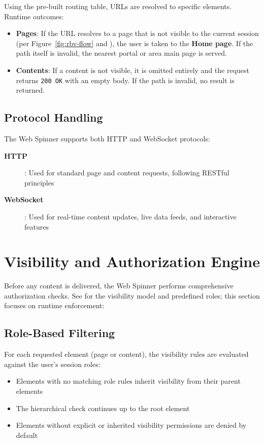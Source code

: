 Using the pre-built routing table, URLs are resolved to specific \wbol{} elements. Runtime outcomes:
\begin{itemize}
	\item \textbf{Pages}: If the URL resolves to a page that is not visible to the current session (per Figure~\ref{fig:rbv-flow} and ), the user is taken to the \textbf{Home page}. If the path itself is invalid, the nearest portal or area main page is served.
	\item \textbf{Contents}: If a content is not visible, it is omitted entirely and the request returns \texttt{200 OK} with an empty body. If the path is invalid, no result is returned.
\end{itemize}

\subsection{Protocol Handling}

The Web Spinner supports both HTTP and WebSocket protocols:
\begin{description}
	\item[\textbf{HTTP}]: Used for standard page and content requests, following RESTful principles
	\item[\textbf{WebSocket}]: Used for real-time content updates, live data feeds, and interactive features
\end{description}

\section{Visibility and Authorization Engine}
\label{sec:authorization-engine}

Before any content is delivered, the Web Spinner performs comprehensive authorization checks. See  for the visibility model and predefined roles; this section focuses on runtime enforcement:

\subsection{Role-Based Filtering}

For each requested element (page or content), the visibility rules are evaluated against the user's session roles:
\begin{itemize}
	\item Elements with no matching role rules inherit visibility from their parent elements
	\item The hierarchical check continues up to the root element
	\item Elements without explicit or inherited visibility permissions are denied by default
\end{itemize}

